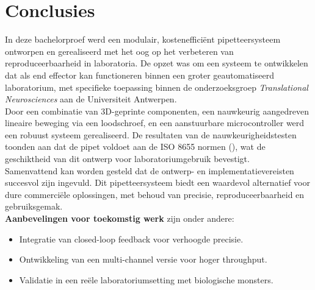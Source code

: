 \chapter{Conclusies}
In deze bachelorproef werd een modulair, kostenefficiënt pipetteersysteem ontworpen en gerealiseerd met het oog op het verbeteren van reproduceerbaarheid in laboratoria. De opzet was om een systeem te ontwikkelen dat als end effector kan functioneren binnen een groter geautomatiseerd laboratorium, met specifieke toepassing binnen de onderzoeksgroep \textit{Translational Neurosciences} aan de Universiteit Antwerpen.
\\[12pt]Door een combinatie van 3D-geprinte componenten, een nauwkeurig aangedreven lineaire beweging via een loodschroef, en een aanstuurbare microcontroller werd een robuust systeem gerealiseerd. De resultaten van de nauwkeurigheidstesten toonden aan dat de pipet voldoet aan de ISO 8655 normen (\cite{RN50}), wat de geschiktheid van dit ontwerp voor laboratoriumgebruik bevestigt.
\\[12pt]Samenvattend kan worden gesteld dat de ontwerp- en implementatievereisten succesvol zijn ingevuld. Dit pipetteersysteem biedt een waardevol alternatief voor dure commerciële oplossingen, met behoud van precisie, reproduceerbaarheid en gebruiksgemak.
\\[12pt]\textbf{Aanbevelingen voor toekomstig werk} zijn onder andere:
\begin{itemize}
  \item Integratie van closed-loop feedback voor verhoogde precisie.
  \item Ontwikkeling van een multi-channel versie voor hoger throughput.
  \item Validatie in een reële laboratoriumsetting met biologische monsters.
\end{itemize}